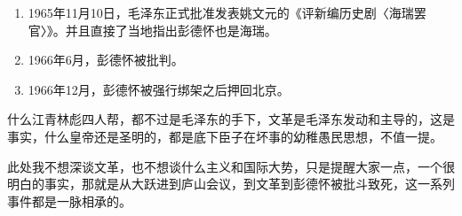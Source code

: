 \documentclass[12pt,oneside]{book}
\begin{document}
\begin{enumerate}
\item 1965年11月10日，毛泽东正式批准发表姚文元的《评新编历史剧〈海瑞罢官〉》。并且直接了当地指出彭德怀也是海瑞。
\item 1966年6月，彭德怀被批判。
\item 1966年12月，彭德怀被强行绑架之后押回北京。
\end{enumerate}

什么江青林彪四人帮，都不过是毛泽东的手下，文革是毛泽东发动和主导的，这是事实，什么皇帝还是圣明的，都是底下臣子在坏事的幼稚愚民思想，不值一提。

此处我不想深谈文革，也不想谈什么主义和国际大势，只是提醒大家一点，一个很明白的事实，那就是从大跃进到庐山会议，到文革到彭德怀被批斗致死，这一系列事件都是一脉相承的。
\end{document}
